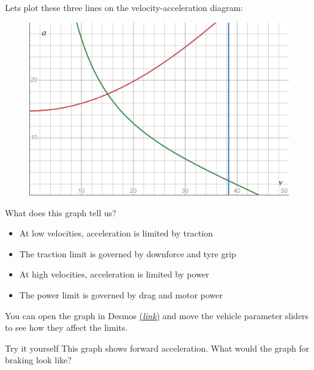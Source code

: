 \begin{frame}
    Lets plot these three lines on the velocity-acceleration diagram:
    \begin{figure}
        \includegraphics[width=\textwidth]{res/velocity-acceleration graph.png}
    \end{figure}
\end{frame}

\begin{frame}
    What does this graph tell us?
    \begin{itemize}
        \item At low velocities, acceleration is limited by traction
        \item The traction limit is governed by downforce and tyre grip
        \item At high velocities, acceleration is limited by power
        \item The power limit is governed by drag and motor power
    \end{itemize}
    You can open the graph in Desmos
    \href{https://www.desmos.com/calculator/vfyipxhjrg}{(\textit{link})}
    and move the vehicle parameter sliders
    to see how they affect the limits.
    \begin{block}{Try it yourself}
        This graph shows forward acceleration.
        What would the graph for braking look like?
    \end{block}
\end{frame}